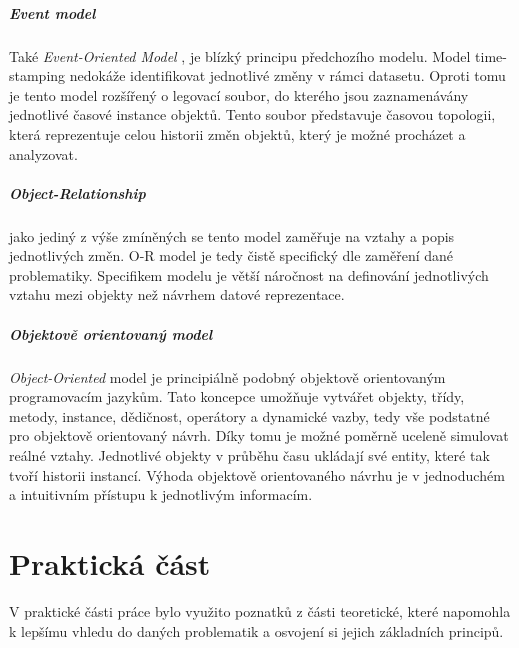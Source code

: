 \documentclass[a4paper,12pt]{report}
\begin{document}
\paragraph*{Event model}
Také \textit{Event-Oriented Model }, je blízký principu předchozího modelu. Model time-stamping nedokáže identifikovat jednotlivé změny v rámci datasetu. Oproti tomu je tento model rozšířený  o legovací soubor, do kterého jsou zaznamenávány jednotlivé časové instance objektů. Tento soubor představuje časovou topologii, která reprezentuje celou historii změn objektů, který je možné procházet a analyzovat.

\paragraph*{Object-Relationship}
jako jediný z výše zmíněných se tento model zaměřuje na vztahy a popis jednotlivých změn. O-R model je tedy čistě specifický dle zaměření dané problematiky. Specifikem  modelu je větší náročnost na definování jednotlivých vztahu mezi objekty než návrhem datové reprezentace. 

\paragraph*{Objektově orientovaný model}
\textit{Object-Oriented} model je principiálně podobný objektově orientovaným programovacím jazykům. Tato koncepce umožňuje vytvářet  objekty, třídy, metody, instance, dědičnost, operátory a dynamické vazby, tedy vše podstatné pro objektově orientovaný návrh. Díky tomu je možné poměrně uceleně simulovat reálné vztahy.  Jednotlivé objekty v průběhu času ukládají své entity, které tak tvoří historii instancí. Výhoda objektově orientovaného návrhu je v jednoduchém a intuitivním přístupu k jednotlivým informacím. 

















\newpage
\chapter*{Praktická část}

V praktické části práce bylo využito poznatků z části teoretické, které napomohla k lepšímu vhledu do daných problematik a osvojení si jejich základních principů. 
\end{document}
